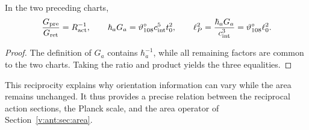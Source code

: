 \begin{proposition}
In the two preceding charts,
\[
\frac{G_{\rm pre}}{G_{\rm ret}}=R_{\rm act}^{-1},\qquad
\hbar_aG_a=\vartheta^\circ_{108}c_{\rm int}^5t_0^2,
\qquad
\ell_P^2=\frac{\hbar_aG_a}{c_{\rm int}^3}
=\vartheta^\circ_{108}\ell_0^2.
\]
\end{proposition}
\begin{proof}
The definition of $G_a$ contains $\hbar_a^{-1}$, while all remaining factors
are common to the two charts. Taking the ratio and product yields
the three equalities.
\end{proof}
This reciprocity explains why orientation information can
vary while the area remains unchanged. It thus provides a precise relation
between the reciprocal action sections, the Planck scale, and the area operator
of Section~\ref{v:ant:sec:area}.
